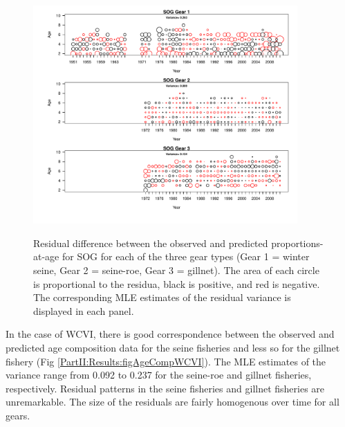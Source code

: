 \begin{figure}
	\centering
	\includegraphics[width=0.9\textwidth]{../FIGS/qPriorFigs/iscam_fig_agecompsresid_SOG.pdf}\\
	\caption{Residual difference between the observed and predicted proportions-at-age for SOG for each of the three gear types (Gear 1 = winter seine, Gear 2 = seine-roe, Gear 3 = gillnet).  The area of each circle is proportional to the residua, black is positive, and red is negative.  The corresponding MLE estimates of the residual variance is displayed in each panel.}\label{PartII:Results:figAgeCompSOG}
\end{figure}

In the case of WCVI, there is good correspondence between the observed and predicted age composition data for the seine fisheries and less so for the gillnet fishery (Fig \ref{PartII:Results:figAgeCompWCVI}).  The MLE estimates of the variance range from 0.092 to 0.237 for the seine-roe and gillnet fisheries, respectively.  Residual patterns in the seine fisheries and gillnet fisheries are unremarkable.   The size of the residuals are fairly homogenous over time for all gears.


